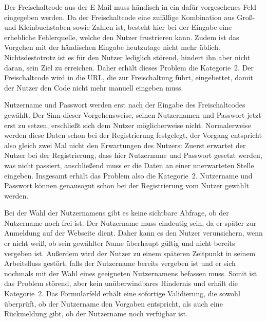 {
Der Freischaltcode aus der E\hbox{-}Mail muss händisch in ein dafür vorgesehenes Feld eingegeben werden.
}
{
Da der Freischaltcode eine zufällige Kombination aus Groß- und Kleinbuchstaben sowie Zahlen ist, besteht hier bei der Eingabe eine erhebliche Fehlerquelle, welche den Nutzer frustrieren kann. Zudem ist das Vorgehen mit der händischen Eingabe heutzutage nicht mehr üblich. Nichtsdestotrotz ist es für den Nutzer lediglich störend, hindert ihn aber nicht daran, sein Ziel zu erreichen. Daher erhält dieses Problem die Kategorie~2.
}
{
Der Freischaltcode wird in die URL, die zur Freischaltung führt, eingebettet, damit der Nutzer den Code nicht mehr manuell eingeben muss.
}
\label{prob:frei:codeeingabe}

{
Nutzername und Passwort werden erst nach der Eingabe des Freischaltcodes gewählt. 
}
{
Der Sinn dieser Vorgehensweise, seinen Nutzernamen und Passwort jetzt erst zu setzen, erschließt sich dem Nutzer möglicherweise nicht. Normalerweise werden diese Daten schon bei der Registrierung festgelegt, der Vorgang entspricht also gleich zwei Mal nicht den Erwartungen des Nutzers: Zuerst erwartet der Nutzer bei der Registrierung, dass hier Nutzername und Passwort gesetzt werden, was nicht passiert, anschließend muss er die Daten an einer unerwarteten Stelle eingeben. Insgesamt erhält das Problem also die Kategorie~2.
}
{
Nutzername und Passwort können genausogut schon bei der Registrierung vom Nutzer gewählt werden.
}
\label{prob:frei:nutzerundpw}

{
Bei der Wahl der Nutzernamens gibt es keine sichtbare Abfrage, ob der Nutzername noch frei ist.
}
{
Der Nutzername muss eindeutig sein, da er später zur Anmeldung auf der Webseite dient. Daher kann es den Nutzer verunsichern, wenn er nicht weiß, ob sein gewählter Name überhaupt gültig und nicht bereits vergeben ist. Außerdem wird der Nutzer zu einem späteren Zeitpunkt in seinem Arbeitsfluss gestört, falls der Nutzername bereits vergeben ist und er sich nochmals mit der Wahl eines geeigneten Nutzernamens befassen muss. Somit ist das Problem störend, aber kein unüberwindbares Hindernis und erhält die Kategorie~2.
}
{
Das Formularfeld erhält eine sofortige Validierung, die sowohl überprüft, ob der Nutzername den Vorgaben entspricht, als auch eine Rückmeldung gibt, ob der Nutzername noch verfügbar ist.
}
\label{prob:frei:nutzerverfuegbar}

